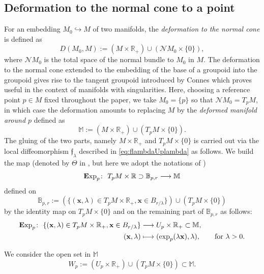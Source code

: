 \documentclass[pdftex]{sigma}
\numberwithin{equation}{section}
\theoremstyle{definition}
\newcommand{\R}{\mathbb R}
\newcommand{\B}{\mathbb B}
\newcommand{\M}{\mathbb M}
\newcommand{\Exp}{{\mathbf E}{\rm xp}}
\begin{document}
\subsection{Deformation to the normal cone to a point}%
For an embedding $M_0\hookrightarrow M$ of two manifolds, the {\it deformation to the normal cone} is defined as
\begin{equation*}
D(M_0, M):= (M\times \R_+ )\cup ({\mathcal N } M_0\times\{0\}),
\end{equation*}
where ${\mathcal N } M_0$ is the total space of the normal bundle to $M_0$ in $M$. The deformation to the normal cone extended to the embedding of the base of a groupoid into the groupoid gives rise to the tangent groupoid introduced by Connes \cite{C} which proves useful in the context of manifolds with singularities. Here, choosing a reference point $p\in M$ fixed throughout the paper, we take $M_0=\{p\}$ so that ${\mathcal N } M_0=T_{p}M$, in which case the deformation amounts to replacing $M$ by the {\it deformed manifold around $p$} defined as
\[
\mathbb M:=(M\times \R_+ )\cup (T_{p}M\times\{0\}).
\]
 The gluing of the two parts, namely $M\times \R_+$ and $T_{p}M\times\{0\}$ is carried out via the local diffeomorphism $\mathfrak{f}_\lambda$ described in \eqref{eq:flambdaUplambda} as follows. We build the map (denoted by $\Theta$ in \cite[Section~3.1]{DS2}, but here we adopt the notations of \cite{vEY})
 \[
 \Exp_{p}\colon \ T_pM\times\R\supset \B_{p, r }\longrightarrow \M
 \]
defined on
 \[
 \B_{p,r}:= (\{({\mathbf x}, \lambda)\in T_{p}M\times \R_+, {\mathbf x}\in B_{r/
\lambda}\} )\cup (T_{p}M\times \{0\} )
\]
 by the identity map on $T_{p}M\times \{0\}$ and on the remaining part of $\B_{p,r}$ as follows:
 \begin{align}
 \Exp_{p}\colon \ \{ ({\mathbf x}, \lambda)\in T_{p}M\times \R_+, {\mathbf x}\in B_{r/
\lambda}\}&\longrightarrow U_{p}\times \R_+ \subset\mathbb M,\nonumber\\
({\mathbf x}, \lambda)&\longmapsto (\exp_{p}(\lambda {\mathbf x}), \lambda), \qquad {\rm for}\ \lambda>0.\label{eq:Fx0}
\end{align}

We consider the open set in $\M$ \cite[Section~1.1]{DS1} \[W_{p}:= ( U_{p}\times \R_+)\cup (T_{p} M\times\{0\} )\subset \M .\]
\end{document}
